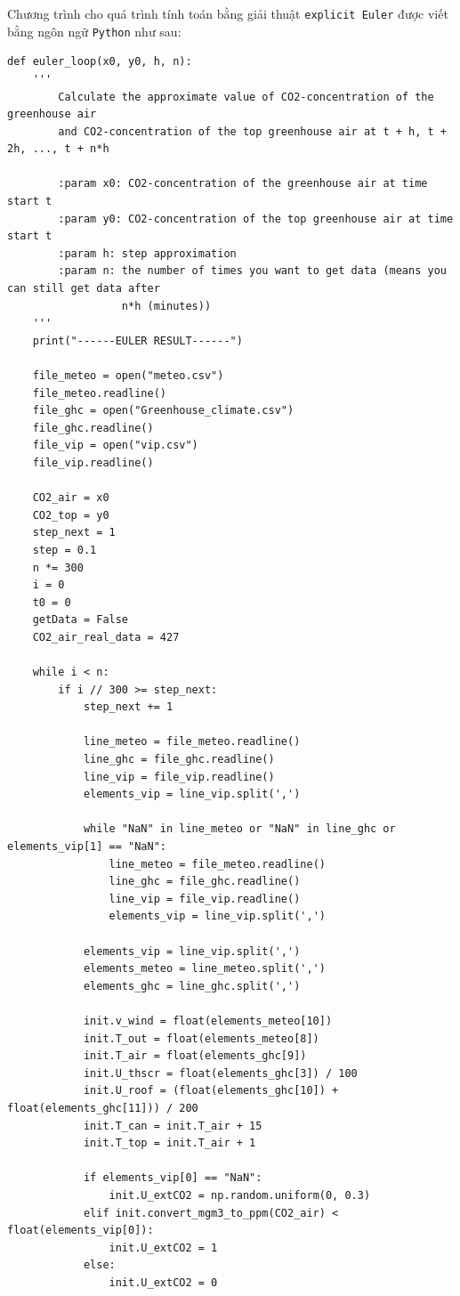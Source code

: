 \documentclass[a4paper]{article}
\begin{document}
Chương trình cho quá trình tính toán bằng giải thuật \texttt{explicit Euler} được viết bằng ngôn ngữ \texttt{Python} như sau:
\begin{verbatim}
def euler_loop(x0, y0, h, n):
    '''
        Calculate the approximate value of CO2-concentration of the greenhouse air
        and CO2-concentration of the top greenhouse air at t + h, t + 2h, ..., t + n*h

        :param x0: CO2-concentration of the greenhouse air at time start t
        :param y0: CO2-concentration of the top greenhouse air at time start t
        :param h: step approximation
        :param n: the number of times you want to get data (means you can still get data after
                  n*h (minutes))
    '''
    print("------EULER RESULT------")

    file_meteo = open("meteo.csv")
    file_meteo.readline()
    file_ghc = open("Greenhouse_climate.csv")
    file_ghc.readline()
    file_vip = open("vip.csv")
    file_vip.readline()

    CO2_air = x0
    CO2_top = y0
    step_next = 1
    step = 0.1
    n *= 300
    i = 0
    t0 = 0
    getData = False
    CO2_air_real_data = 427

    while i < n:
        if i // 300 >= step_next:
            step_next += 1

            line_meteo = file_meteo.readline()
            line_ghc = file_ghc.readline()
            line_vip = file_vip.readline()
            elements_vip = line_vip.split(',')

            while "NaN" in line_meteo or "NaN" in line_ghc or elements_vip[1] == "NaN":
                line_meteo = file_meteo.readline()
                line_ghc = file_ghc.readline()
                line_vip = file_vip.readline()
                elements_vip = line_vip.split(',')

            elements_vip = line_vip.split(',')
            elements_meteo = line_meteo.split(',')
            elements_ghc = line_ghc.split(',')

            init.v_wind = float(elements_meteo[10])
            init.T_out = float(elements_meteo[8])
            init.T_air = float(elements_ghc[9])
            init.U_thscr = float(elements_ghc[3]) / 100
            init.U_roof = (float(elements_ghc[10]) + float(elements_ghc[11])) / 200
            init.T_can = init.T_air + 15
            init.T_top = init.T_air + 1

            if elements_vip[0] == "NaN":
                init.U_extCO2 = np.random.uniform(0, 0.3)
            elif init.convert_mgm3_to_ppm(CO2_air) < float(elements_vip[0]):
                init.U_extCO2 = 1
            else:
                init.U_extCO2 = 0


\end{verbatim}
\end{document}
